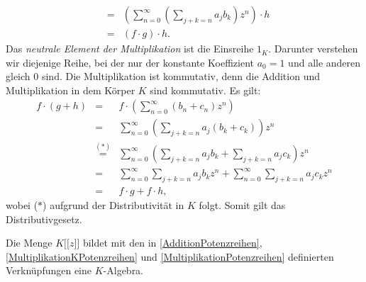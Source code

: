 {\begin{eqnarray*}
&=& \left(\sum_{n=0}^\infty \left(\sum_{j+k=n} a_j b_k\right) z^n\right) \cdot h \\
&=& \left(f \cdot g\right) \cdot h.
\end{eqnarray*} 
Das \textit{neutrale Element der Multiplikation} ist die Einsreihe $1_K$. Darunter verstehen wir diejenige Reihe, bei der nur der konstante Koeffizient $a_0 = 1$ und alle anderen gleich $0$ sind.
Die Multiplikation ist kommutativ, denn die Addition und Multiplikation in dem Körper $K$ sind kommutativ. 
Es gilt:
\begin{eqnarray*}
f\cdot \left(g + h\right) &=& f \cdot \left( \sum_{n=0}^\infty \left(b_n + c_n\right) z^n \right)\\
&=& \sum_{n=0}^\infty \left(\sum_{j+k=n} a_j \left(b_k +c_k\right)\right) z^n\\
&\stackrel{\mathrm{(*)}}=& \sum_{n=0}^\infty \left(\sum_{j+k=n} a_j b_k +\sum_{j+k=n} a_j c_k\right) z^n\\
&=& \sum_{n=0}^\infty \sum_{j+k=n} a_j b_k z^n +\sum_{n=0}^\infty \sum_{j+k=n} a_j c_k z^n\\
&=& f\cdot g + f\cdot h,
\end{eqnarray*}
wobei ($*$) aufgrund der Distributivität in $K$ folgt. Somit gilt das Distributivgesetz.\\
 }
%
%
%
%
\begin{bem}
Die Menge $K\lbrack\lbrack z\rbrack\rbrack$ bildet mit den in \ref{AdditionPotenzreihen}, \ref{MultiplikationKPotenzreihen} und \ref{MultiplikationPotenzreihen} definierten Verknüpfungen eine $K$-Algebra.
\end{bem}
%
%
